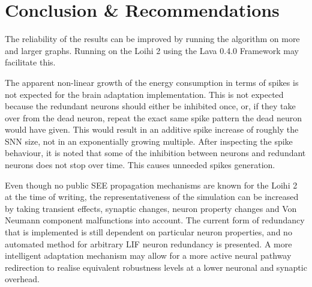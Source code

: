 \section{Conclusion \& Recommendations}\label{sec:discussion}
The reliability of the results can be improved by running the algorithm on more and larger graphs. Running on the Loihi 2 using the Lava 0.4.0 Framework may facilitate this. 

The apparent non-linear growth of the energy consumption in terms of spikes is not expected for the brain adaptation implementation. This is not expected because the redundant neurons should either be inhibited once, or, if they take over from the dead neuron, repeat the exact same spike pattern the dead neuron would have given. This would result in an additive spike increase of roughly the SNN size, not in an exponentially growing multiple. After inspecting the spike behaviour, it is noted that some of the inhibition between neurons and redundant neurons does not stop over time. This causes unneeded spikes generation.

Even though no public SEE propagation mechanisms are known for the Loihi 2 at the time of writing, the representativeness of the simulation can be increased by taking transient effects, synaptic changes, neuron property changes and Von Neumann component malfunctions into account. The current form of redundancy that is implemented is still dependent on particular neuron properties, and no automated method for arbitrary LIF neuron redundancy is presented. A more intelligent adaptation mechanism may allow for a more active neural pathway redirection to realise equivalent robustness levels at a lower neuronal and synaptic overhead. 


